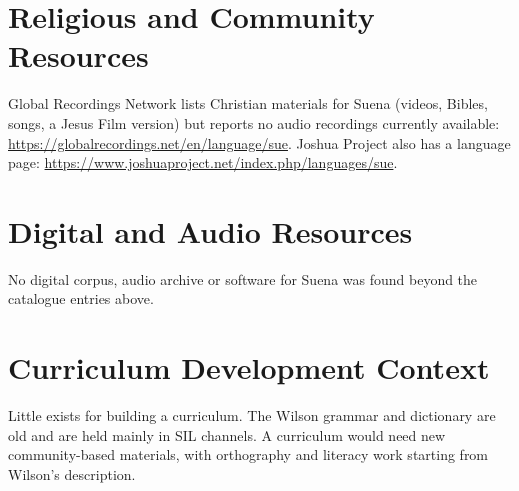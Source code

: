\documentclass[12pt]{article}
\begin{document}
\section{Religious and Community Resources}
Global Recordings Network lists Christian materials for Suena (videos, Bibles, songs, a Jesus Film version) but reports no audio recordings currently available: \url{https://globalrecordings.net/en/language/sue}. Joshua Project also has a language page: \url{https://www.joshuaproject.net/index.php/languages/sue}.

\section{Digital and Audio Resources}
No digital corpus, audio archive or software for Suena was found beyond the catalogue entries above.

\section{Curriculum Development Context}
Little exists for building a curriculum. The Wilson grammar and dictionary are old and are held mainly in SIL channels. A curriculum would need new community-based materials, with orthography and literacy work starting from Wilson's description.
\end{document}
